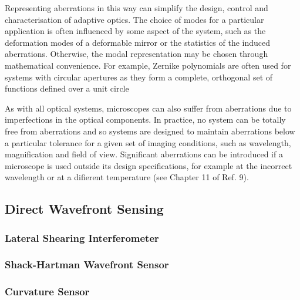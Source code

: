 Representing aberrations in this way can simplify the design, control and 
characterisation of adaptive optics. The choice of modes for a particular 
application is often influenced by some aspect of the system, such as the 
deformation modes of a deformable mirror or the statistics of the induced 
aberrations. Otherwise, the modal representation may be chosen through 
mathematical convenience. For example, Zernike polynomials are often used for 
systems with circular apertures as they form a complete, orthogonal set of 
functions defined over a unit circle

As with all optical systems, microscopes can also suffer from aberrations due 
to imperfections in the optical components. In practice, no system can be 
totally free from aberrations and so systems are designed to maintain 
aberrations below a particular tolerance for a given set of imaging 
conditions, such as wavelength, magnification and field of view. Significant 
aberrations can be introduced if a microscope is used outside its design 
specifications, for example at the incorrect wavelength or at a difierent 
temperature (see Chapter 11 of Ref. 9).

\cite{AOM_basic_ref}


\subsection{Direct Wavefront Sensing}
\label{sec:WavefrontSensing}

\subsubsection{Lateral Shearing Interferometer}
\label{sec:DirectWavefrontSensing_interferometry}

\subsubsection{Shack-Hartman Wavefront Sensor}
\label{sec:DirectWavefrontSensing_SHWS}

\subsubsection{Curvature Sensor}
\label{sec:CurvatureSensor}



